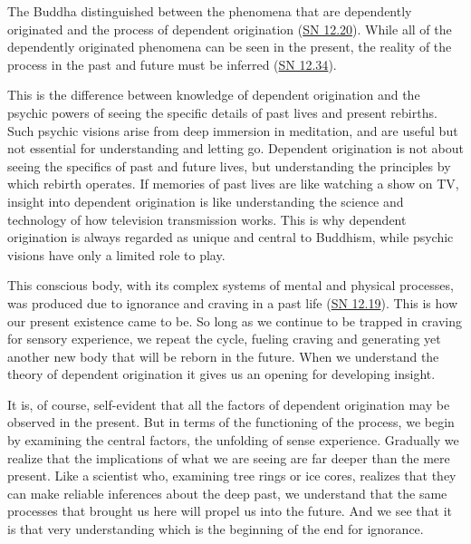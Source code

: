 \documentclass[12pt,openany]{book}%
\begin{document}
The Buddha distinguished between the phenomena that are dependently originated and the process of dependent origination (\href{https://suttacentral.net/sn12.20}{SN 12.20}). While all of the dependently originated phenomena can be seen in the present, the reality of the process in the past and future must be inferred (\href{https://suttacentral.net/sn12.34}{SN 12.34}).

This is the difference between knowledge of dependent origination and the psychic powers of seeing the specific details of past lives and present rebirths. Such psychic visions arise from deep immersion in meditation, and are useful but not essential for understanding and letting go. Dependent origination is not about seeing the specifics of past and future lives, but understanding the principles by which rebirth operates. If memories of past lives are like watching a show on TV, insight into dependent origination is like understanding the science and technology of how television transmission works. This is why dependent origination is always regarded as unique and central to Buddhism, while psychic visions have only a limited role to play.

This conscious body, with its complex systems of mental and physical processes, was produced due to ignorance and craving in a past life (\href{https://suttacentral.net/sn12.19}{SN 12.19}). This is how our present existence came to be. So long as we continue to be trapped in craving for sensory experience, we repeat the cycle, fueling craving and generating yet another new body that will be reborn in the future. When we understand the theory of dependent origination it gives us an opening for developing insight.

It is, of course, self-evident that all the factors of dependent origination may be observed in the present. But in terms of the functioning of the process, we begin by examining the central factors, the unfolding of sense experience. Gradually we realize that the implications of what we are seeing are far deeper than the mere present. Like a scientist who, examining tree rings or ice cores, realizes that they can make reliable inferences about the deep past, we understand that the same processes that brought us here will propel us into the future. And we see that it is that very understanding which is the beginning of the end for ignorance.
\end{document}
